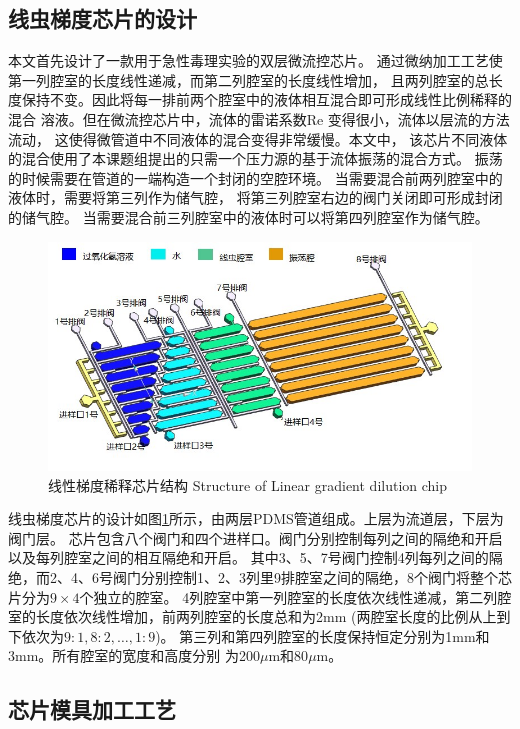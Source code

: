 \subsection{线虫梯度芯片的设计}
\label{arch-design}
本文首先设计了一款用于急性毒理实验的双层微流控芯片。
通过微纳加工工艺使第一列腔室的长度线性递减，而第二列腔室的长度线性增加，
且两列腔室的总长度保持不变。因此将每一排前两个腔室中的液体相互混合即可形成线性比例稀释的混合
溶液。但在微流控芯片中，流体的雷诺系数Re 变得很小，流体以层流的方法流动，
这使得微管道中不同液体的混合变得非常缓慢。本文中，
该芯片不同液体的混合使用了本课题组提出的只需一个压力源的基于流体振荡的混合方式\cite{cheng2018simple}。
振荡的时候需要在管道的一端构造一个封闭的空腔环境。
当需要混合前两列腔室中的液体时，需要将第三列作为储气腔，
将第三列腔室右边的阀门关闭即可形成封闭的储气腔。
当需要混合前三列腔室中的液体时可以将第四列腔室作为储气腔。
\begin{figure}[htbp]
	  \centering
	  \includegraphics[width=13cm]{figure/chap2/chip-arch.jpg}
	  \bicaption
		{线性梯度稀释芯片结构}
		{Structure of Linear gradient dilution chip}
	  \label{fig:chap2:chip-arch}
	\end{figure}
	
线虫梯度芯片的设计如图\ref{fig:chap2:chip-arch}所示，由两层PDMS管道组成。上层为流道层，下层为阀门层。
芯片包含八个阀门和四个进样口。阀门分别控制每列之间的隔绝和开启以及每列腔室之间的相互隔绝和开启。
其中3、5、7号阀门控制4列每列之间的隔绝，而2、4、6号阀门分别控制1、2、3列里9排腔室之间的隔绝，8个阀门将整个芯片分为$9\times4$个独立的腔室。
4列腔室中第一列腔室的长度依次线性递减，第二列腔室的长度依次线性增加，前两列腔室的长度总和为2mm (两腔室长度的比例从上到下依次为$9:1,8:2,\dots,1:9$)。
第三列和第四列腔室的长度保持恒定分别为1mm和3mm。所有腔室的宽度和高度分别
为200$\mu$m和80$\mu$m。

\subsection{芯片模具加工工艺}
